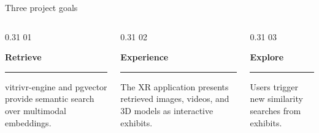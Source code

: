 \begin{frame}[c]{Three project goals}
\begin{columns}[T,onlytextwidth]
  \begin{column}{0.31\textwidth}
    \textcolor{unired}{\LARGE 01}

    \vspace{0.1cm}
    \large \textbf{Retrieve}

    \vspace{0.12cm}
    \color{unimint}\rule{\linewidth}{1.6pt}

    \vspace{0.2cm}
    \small
    vitrivr-engine and pgvector provide semantic search over multimodal embeddings.
  \end{column}
  \begin{column}{0.31\textwidth}
    \textcolor{unired}{\LARGE 02}

    \vspace{0.1cm}
    \large \textbf{Experience}

    \vspace{0.12cm}
    \color{unimint}\rule{\linewidth}{1.6pt}

    \vspace{0.2cm}
    \small
    The XR application presents retrieved images, videos, and 3D models as interactive exhibits.
  \end{column}
  \begin{column}{0.31\textwidth}
    \textcolor{unired}{\LARGE 03}

    \vspace{0.1cm}
    \large \textbf{Explore}

    \vspace{0.12cm}
    \color{unimint}\rule{\linewidth}{1.6pt}

    \vspace{0.2cm}
    \small
    Users trigger new similarity searches from exhibits.
  \end{column}
\end{columns}
\end{frame}
